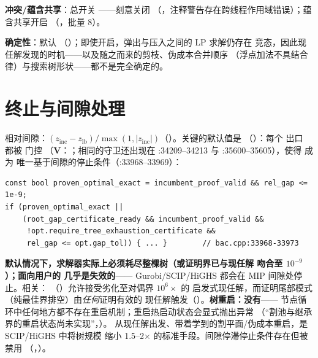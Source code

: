 \documentclass[11pt]{ctexart}
\begin{document}
\textbf{冲突/蕴含共享}：总开关
——刻意关闭
（，注释警告存在跨线程作用域错误）；蕴含共享开启
（，批量 8）。

\textbf{确定性}：默认 
（）；即使开启，弹出与压入之间的 LP 求解仍存在
竞态，因此现任解发现的时机——以及随之而来的剪枝、伪成本合并顺序
（浮点加法不具结合律）与搜索树形状——都不是完全确定的。

\section{终止与间隙处理}
\label{sec:termination}

相对间隙：$(z_{\mathrm{inc}} - z_{\mathrm{lb}})/\max(1,
|z_{\mathrm{inc}}|)$（）。关键的默认值是
（）：每个  出口
都被  门控
（\textbf{V}：；相同的守卫还出现在
:34209--34213 与 :35600--35605），使得  成为
唯一基于间隙的停止条件（:33968--33969）：
\begin{lstlisting}[style=code]
const bool proven_optimal_exact = incumbent_proof_valid && rel_gap <= 1e-9;
if (proven_optimal_exact ||
    (root_gap_certificate_ready && incumbent_proof_valid &&
     !opt.require_tree_exhaustion_certificate &&
     rel_gap <= opt.gap_tol)) { ... }        // bac.cpp:33968-33973
\end{lstlisting}
\textbf{默认情况下，求解器实际上必须耗尽整棵树（或证明界已与现任解
吻合至 $10^{-9}$）；面向用户的  几乎是失效的}——
Gurobi/SCIP/HiGHS 都会在 MIP 间隙处停止。相关：
（）允许接受劣化至对偶界 $10^6\times$ 的
启发式现任解，而证明尾部模式（纯最佳界排空）由\emph{任何}证明有效的
现任解触发（）。\textbf{树重启：没有}——
节点循环中任何地方都不存在重启机制；重启热启动状态会显式抛出异常
（“割池与继承界的重启状态尚未实现”，）。
从现任解出发、带着学到的割平面/伪成本重启，是 SCIP/HiGHS 中将树规模
缩小 1.5--2$\times$ 的标准手段。间隙停滞停止条件存在但被禁用
（，）。
\end{document}
